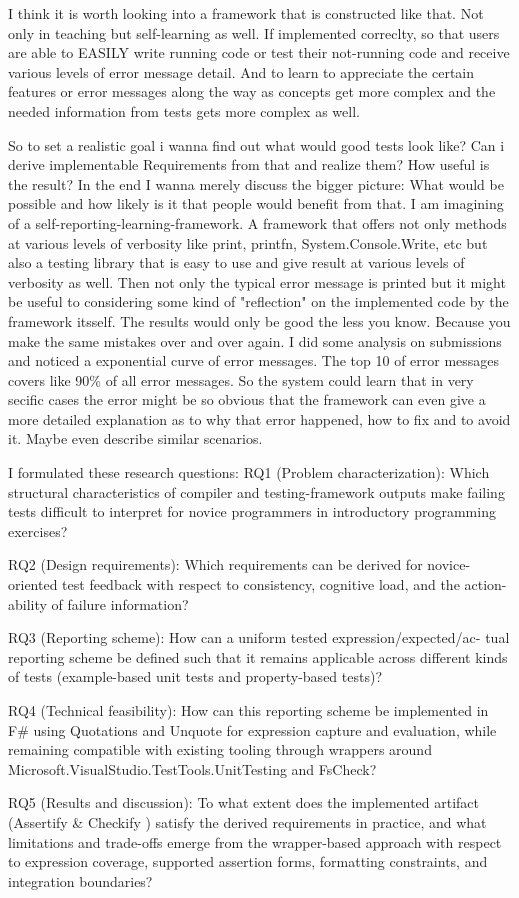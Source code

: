 \documentclass[
	bibliography=totoc,
	listof=totoc,
]{scrbook}
\begin{document}
\begin{justify}
I think it is worth looking into a framework that is constructed like that. Not only in teaching but self-learning as well.
If implemented correclty, so that users are able to EASILY write running code or test their not-running code and receive various levels of error message detail.
And to learn to appreciate the certain features or error messages along the way as concepts get more complex and the needed information from tests gets more complex
as well.

So to set a realistic goal i wanna find out what would good tests look like?
Can i derive implementable Requirements from that and realize them?
How useful is the result?
In the end I wanna merely discuss the bigger picture:
What would be possible and how likely is it that people would benefit from that.
I am imagining of a self-reporting-learning-framework. A framework that offers not only methods at various levels of verbosity like print, printfn,
System.Console.Write, etc but also a testing library that is easy to use and give result at various levels of verbosity as well.
Then not only the typical error message is printed but it might be useful to considering some kind of "reflection" on the implemented code by the framework itsself.
The results would only be good the less you know. Because you make the same mistakes over and over again.
I did some analysis on submissions and noticed a exponential curve of error messages. The top 10 of error messages covers like 90\% of all error messages.
So the system could learn that in very secific cases the error might be so obvious that the framework can even give a more detailed explanation as to why that error
happened, how to fix and to avoid it. Maybe even describe similar scenarios.

I formulated these research questions:
RQ1 (Problem characterization): Which structural characteristics of compiler
and testing-framework outputs make failing tests difficult to interpret for novice
programmers in introductory programming exercises?

RQ2 (Design requirements): Which requirements can be derived for novice-
oriented test feedback with respect to consistency, cognitive load, and the action-
ability of failure information?

RQ3 (Reporting scheme): How can a uniform tested expression/expected/ac-
tual reporting scheme be defined such that it remains applicable across different
kinds of tests (example-based unit tests and property-based tests)?

RQ4 (Technical feasibility): How can this reporting scheme be implemented in
F\# using Quotations and Unquote for expression capture and evaluation, while
remaining compatible with existing tooling through wrappers around
Microsoft.VisualStudio.TestTools.UnitTesting and FsCheck?

RQ5 (Results and discussion): To what extent does the implemented artifact
(Assertify \& Checkify ) satisfy the derived requirements in practice, and what
limitations and trade-offs emerge from the wrapper-based approach with respect
to expression coverage, supported assertion forms, formatting constraints, and
integration boundaries?
\end{justify}
\end{document}
